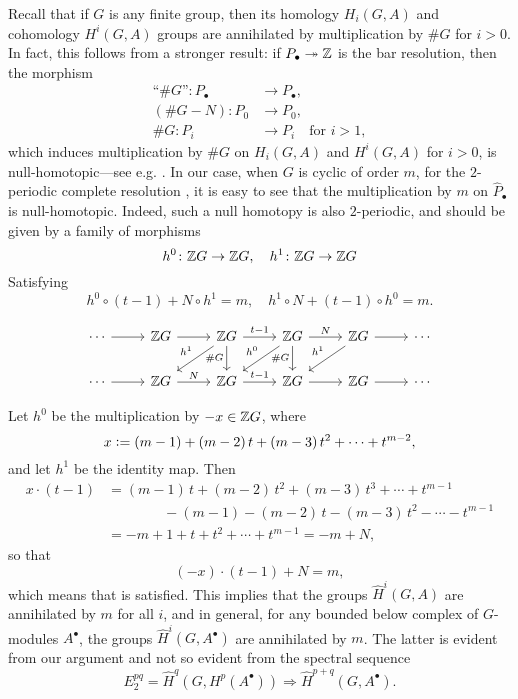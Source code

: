 \begin{example}
  Recall that if $G$ is any finite group, then its homology $H_i (G,A)$ and
  cohomology $H^i (G,A)$ groups are annihilated by multiplication by $\# G$ for
  $i > 0$. In fact, this follows from a stronger result: if $P_\bullet \twoheadrightarrow \mathbb{Z}$
  is the bar resolution, then the morphism
  \begin{align*}
    \text{``}\# G\text{''}\colon P_\bullet & \to P_\bullet, \\
    (\#G-N)\colon P_0 & \to P_0,\\
    \#G\colon P_i & \to P_i \quad\text{for }i > 1,
  \end{align*}
  which induces multiplication by $\# G$ on $H_i (G,A)$ and $H^i (G,A)$ for
  $i > 0$, is null-homotopic---see e.g. \cite[Theorem 6.5.8]{Weibel-94}. In our
  case, when $G$ is cyclic of order $m$, for the $2$-periodic complete
  resolution , it is
  easy to see that the multiplication by $m$ on $\widehat{P}_\bullet$ is
  null-homotopic. Indeed, such a null homotopy is also $2$-periodic, and should
  be given by a family of morphisms
  $$h^0\colon \mathbb{Z} G \to \mathbb{Z} G, \quad h^1\colon \mathbb{Z} G \to \mathbb{Z} G$$
  Satisfying
  \begin{equation}
    \label{eqn:1002808953}
    h^0\circ (t-1) + N\circ h^1 = m, \quad h^1\circ N + (t-1)\circ h^0 = m.
  \end{equation}

  \[ \begin{tikzcd}
      \cdots \ar{r} & \ZZ G \ar{r} & \ZZ G \ar{r}{t-1}\ar{dl}[swap]{h^1}\ar{d}[swap]{\# G} & \ZZ G \ar{r}{N}\ar{dl}[swap]{h^0}\ar{d}[swap]{\# G} & \ZZ G \ar{r}\ar{dl}[swap]{h^1} & \cdots \\
      \cdots \ar{r} & \ZZ G \ar{r}{N} & \ZZ G \ar{r}{t-1} & \ZZ G \ar{r} & \ZZ G \ar{r} & \cdots
    \end{tikzcd} \]

  Let $h^0$ be the multiplication by $-x \in \mathbb{Z} G$, where
  $$x \mathrel{\mathop:}= (m-1) + (m-2)\,t + (m-3)\,t^2 + \cdots + t^{m-2},$$
  and let $h^1$ be the identity map. Then
  \begin{align*}
    x\cdot (t-1) & = (m-1)\,t + (m-2)\,t^2 + (m-3)\,t^3 + \cdots + t^{m-1} \\
                 & \quad\quad\quad\quad - (m-1) - (m-2)\,t - (m-3)\,t^2 - \cdots - t^{m-1} \\
                 & = -m + 1 + t + t^2 + \cdots + t^{m-1} = -m + N,
  \end{align*}
  so that
  $$(-x)\cdot (t-1) + N = m,$$
  which means that  is satisfied. This implies that the
  groups $\widehat{H}^i (G,A)$ are annihilated by $m$ for all $i$, and in
  general, for any bounded below complex of $G$-modules $A^\bullet$, the groups
  $\widehat{H}^i (G,A^\bullet)$ are annihilated by $m$. The latter is evident
  from our argument and not so evident from the spectral sequence
  \[ E_2^{pq} = \widehat{H}^q (G, H^p (A^\bullet))
    \Longrightarrow \widehat{H}^{p+q} (G,A^\bullet). \]
\end{example}

